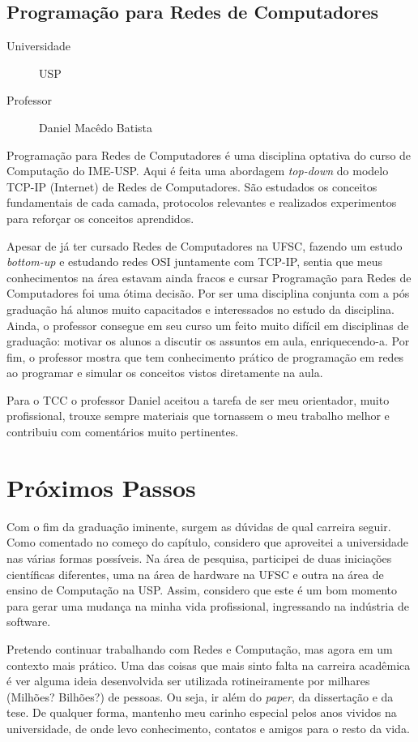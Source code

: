 \subsection{Programação para Redes de Computadores}
\begin{description}
	\item[Universidade] USP
	\item[Professor] Daniel Macêdo Batista
\end{description}

Programação para Redes de Computadores é uma disciplina optativa do curso de
Computação do IME-USP. Aqui é feita uma abordagem \emph{top-down} do modelo
TCP-IP (Internet) de Redes de Computadores. São estudados os conceitos
fundamentais de cada camada, protocolos relevantes e realizados experimentos
para reforçar os conceitos aprendidos.

Apesar de já ter cursado Redes de Computadores na UFSC, fazendo um estudo
\emph{bottom-up} e estudando redes OSI juntamente com TCP-IP, sentia que meus 
conhecimentos na área estavam ainda fracos e cursar Programação para Redes de
Computadores foi uma ótima decisão. Por ser uma disciplina conjunta com a pós
graduação há alunos muito capacitados e interessados no estudo da disciplina.
Ainda, o professor consegue em seu curso um feito muito difícil em disciplinas de
graduação: motivar os alunos a discutir os assuntos em aula, enriquecendo-a.
Por fim, o professor mostra que tem conhecimento prático de programação em redes
ao programar e simular os conceitos vistos diretamente na aula.

Para o TCC o professor Daniel aceitou a tarefa de ser meu orientador, muito 
profissional, trouxe sempre materiais que tornassem o meu trabalho melhor e 
contribuiu com comentários muito pertinentes.


\section{Próximos Passos}
\label{sec:proximos_passos}
Com o fim da graduação iminente, surgem as dúvidas de qual carreira seguir.
Como comentado no começo do capítulo, considero que aproveitei a universidade
nas várias formas possíveis. Na área de pesquisa, participei de duas iniciações
científicas diferentes, uma na área de hardware na UFSC e outra na área de
ensino de Computação na USP. Assim, considero que este é um bom momento para 
gerar uma mudança na minha vida profissional, ingressando na indústria de
software.

Pretendo continuar trabalhando com Redes e Computação, mas agora em um
contexto mais prático. Uma das coisas que mais sinto falta na carreira acadêmica
é ver alguma ideia desenvolvida ser utilizada rotineiramente por milhares
(Milhões? Bilhões?) de pessoas. Ou seja, ir além do \emph{paper}, da dissertação
e da tese. De qualquer forma, mantenho meu carinho especial pelos anos vividos
na universidade, de onde levo conhecimento, contatos e amigos para o resto da
vida.



